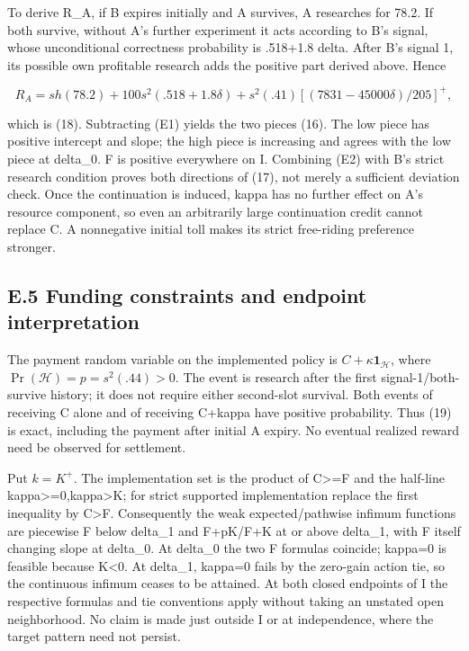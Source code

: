 \documentclass[
  11pt,
]{article}
\begin{document}
To derive R\_A, if B expires initially and A survives, A researches for
78.2. If both survive, without A's further experiment it acts according
to B's signal, whose unconditional correctness probability is .518+1.8
delta. After B's signal 1, its possible own profitable research adds the
positive part derived above. Hence

\[R_A=sh(78.2)+100s^2(.518+1.8\delta)
+s^2(.41)[(7831-45000\delta)/205]^+,\]

which is (18). Subtracting (E1) yields the two pieces (16). The low
piece has positive intercept and slope; the high piece is increasing and
agrees with the low piece at delta\_0. F is positive everywhere on I.
Combining (E2) with B's strict research condition proves both directions
of (17), not merely a sufficient deviation check. Once the continuation
is induced, kappa has no further effect on A's resource component, so
even an arbitrarily large continuation credit cannot replace C. A
nonnegative initial toll makes its strict free-riding preference
stronger.

\subsection{E.5 Funding constraints and endpoint
interpretation}\label{e.5-funding-constraints-and-endpoint-interpretation}

The payment random variable on the implemented policy is
\(C+\kappa\mathbf1_{\mathcal H}\), where
\(\Pr(\mathcal H)=p=s^2(.44)>0\). The event is research after the first
signal-1/both-survive history; it does not require either second-slot
survival. Both events of receiving C alone and of receiving C+kappa have
positive probability. Thus (19) is exact, including the payment after
initial A expiry. No eventual realized reward need be observed for
settlement.

Put \(k=K^+\). The implementation set is the product of C\textgreater=F
and the half-line kappa\textgreater=0,kappa\textgreater K; for strict
supported implementation replace the first inequality by
C\textgreater F. Consequently the weak expected/pathwise infimum
functions are piecewise F below delta\_1 and F+pK/F+K at or above
delta\_1, with F itself changing slope at delta\_0. At delta\_0 the two
F formulas coincide; kappa=0 is feasible because K\textless0. At
delta\_1, kappa=0 fails by the zero-gain action tie, so the continuous
infimum ceases to be attained. At both closed endpoints of I the
respective formulas and tie conventions apply without taking an unstated
open neighborhood. No claim is made just outside I or at independence,
where the target pattern need not persist.
\end{document}
